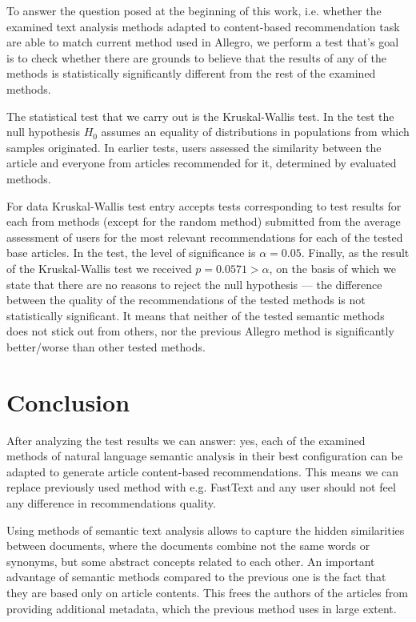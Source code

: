 \documentclass[twoside,twocolumn]{article}
\begin{document}
	To answer the question posed at the beginning of this work, i.e. whether the examined text analysis methods adapted to content-based recommendation task are able to match current method used in Allegro, we perform a test that's goal is to check whether there are grounds to believe that the results of any of the methods is statistically significantly different from the rest of the examined methods.
		
	The statistical test that we carry out is the Kruskal-Wallis test. In the test the null hypothesis $H_0$ assumes an equality of distributions in populations from which samples originated.
	In earlier tests, users assessed the similarity between the article and everyone from articles recommended for it, determined by evaluated methods.
	
	For data Kruskal-Wallis test entry accepts tests corresponding to test results for each from methods (except for the random method) submitted from the average assessment of users for the most relevant recommendations for each of the tested base articles.
	In the test, the level of significance is $\alpha = 0.05$. Finally, as the result of the Kruskal-Wallis test we received $p = 0.0571>\alpha$, on the basis of which we state that there are no reasons to	reject the null hypothesis --- the difference between the quality of the recommendations of the tested methods is not statistically significant. It means that neither of the tested semantic methods does not stick out from others, nor the previous Allegro method is significantly better/worse than other tested methods.
	
	\section{Conclusion}
	
	After analyzing the test results we can answer: yes, each of the examined methods of natural language semantic analysis in their best configuration can be adapted to generate article content-based recommendations. This means we can replace previously used method with e.g. FastText and any user should not feel any difference in recommendations quality.
	
	Using methods of semantic text analysis allows to capture the hidden similarities between documents, where the documents combine not the same words or synonyms, but some abstract concepts related to each other. An important advantage of semantic methods compared to the previous one is the fact that they are based only on article contents. This frees the authors of the articles from providing additional metadata, which the previous method uses in large extent.
	
\end{document}
